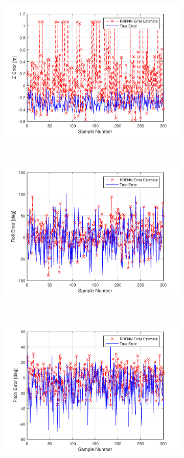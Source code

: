 \begin{figure}
\begin{subfigure}{0.3\textwidth}
    \includegraphics[width=\textwidth]{figures/chapter4/z_valid}
    \caption{}
  \end{subfigure}
~
  \begin{subfigure}{0.3\textwidth}
    \includegraphics[width=\textwidth]{figures/chapter4/roll_valid}
    \caption{}
  \end{subfigure}
~
  \begin{subfigure}{0.3\textwidth}
    \includegraphics[width=\textwidth]{figures/chapter4/pitch_valid}

\end{subfigure}
\end{figure}

